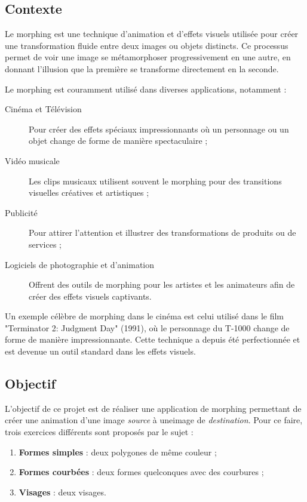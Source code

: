 \documentclass[11pt, titlepage]{article}
\begin{document}
\subsection{Contexte}

Le morphing est une technique d'animation et d'effets visuels utilisée pour créer une transformation fluide entre deux images ou objets distincts. Ce processus permet de voir une image se métamorphoser progressivement en une autre, en donnant l'illusion que la première se transforme directement en la seconde.

Le morphing est couramment utilisé dans diverses applications, notamment :

\begin{description}
	\item[Cinéma et Télévision] Pour créer des effets spéciaux impressionnants où un personnage ou un objet change de forme de manière spectaculaire ;
	\item[Vidéo musicale] Les clips musicaux utilisent souvent le morphing pour des transitions visuelles créatives et artistiques ;
	\item[Publicité] Pour attirer l'attention et illustrer des transformations de produits ou de services ;
	\item[Logiciels de photographie et d'animation] Offrent des outils de morphing pour les artistes et les animateurs afin de créer des effets visuels captivants.
\end{description}

Un exemple célèbre de morphing dans le cinéma est celui utilisé dans le film "Terminator 2: Judgment Day" (1991), où le personnage du T-1000 change de forme de manière impressionnante. Cette technique a depuis été perfectionnée et est devenue un outil standard dans les effets visuels.


\subsection{Objectif}

L'objectif de ce projet est de réaliser une application de morphing permettant de créer une animation d'une image  \emph{source} à uneimage de  \emph{destination}. Pour ce faire, trois exercices différents sont proposés par le sujet :

\begin{enumerate}
	\item \textbf{Formes simples} : deux polygones de même couleur ;
	\item \textbf{Formes courbées} : deux formes quelconques avec des courbures ;
	\item \textbf{Visages} : deux visages.
\end{enumerate}
\end{document}
